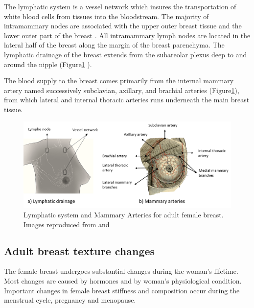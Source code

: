 The lymphatic system is a vessel network which insures the transportation of white blood cells from tissues into the bloodstream. The majority of intramammary nodes are associated with the upper outer breast tissue and the lower outer part of the breast \citep{kopans2007breast}.  All intramammary lymph nodes are located in the lateral half of the breast along the margin of the breast parenchyma.  The lymphatic drainage of the breast extends from the subareolar plexus deep to and around the nipple (Figure\ref{fig:lyphaticDrainageandArtery} ).

The blood supply to the breast comes primarily from the internal mammary artery named successively subclavian, axillary, and brachial arteries (Figure\ref{fig:lyphaticDrainageandArtery}), from which lateral and internal thoracic arteries runs underneath the main breast tissue.

	
\begin{figure}[!h]
\centering
\includegraphics[width=\textwidth,keepaspectratio]{figures/lyphaticDrainageandArtery.PNG} 
\caption[Lymphatic system and Mammary Arteries for adult female breast. ]{Lymphatic system and Mammary Arteries for adult female breast.  Images reproduced from \cite{NCI_2012} and \cite{pilcher_breast_1917}}
\label{fig:lyphaticDrainageandArtery}
\end{figure}





\subsection{Adult breast texture changes}\label{subsection:adultbreasttexturechanges}

The female breast undergoes substantial changes during the woman's lifetime.  Most changes are caused by hormones and by woman's physiological condition. Important changes in female breast stiffness and composition occur during the menstrual cycle, pregnancy and menopause. 

